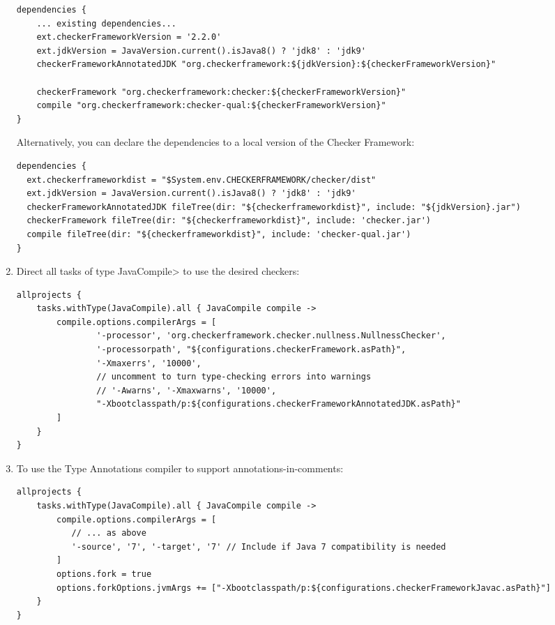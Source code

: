 \begin{enumerate}
\begin{Verbatim}
dependencies {
    ... existing dependencies...
    ext.checkerFrameworkVersion = '2.2.0'
    ext.jdkVersion = JavaVersion.current().isJava8() ? 'jdk8' : 'jdk9'
    checkerFrameworkAnnotatedJDK "org.checkerframework:${jdkVersion}:${checkerFrameworkVersion}"

    checkerFramework "org.checkerframework:checker:${checkerFrameworkVersion}"
    compile "org.checkerframework:checker-qual:${checkerFrameworkVersion}"
}
\end{Verbatim}

Alternatively, you can declare the dependencies to a local version of the Checker Framework:

\begin{Verbatim}
dependencies {
  ext.checkerframeworkdist = "$System.env.CHECKERFRAMEWORK/checker/dist"
  ext.jdkVersion = JavaVersion.current().isJava8() ? 'jdk8' : 'jdk9'
  checkerFrameworkAnnotatedJDK fileTree(dir: "${checkerframeworkdist}", include: "${jdkVersion}.jar")
  checkerFramework fileTree(dir: "${checkerframeworkdist}", include: 'checker.jar')
  compile fileTree(dir: "${checkerframeworkdist}", include: 'checker-qual.jar')
}
\end{Verbatim}

\item Direct all tasks of type \<JavaCompile> to use the desired checkers:

\begin{mysmall}
\begin{Verbatim}
allprojects {
    tasks.withType(JavaCompile).all { JavaCompile compile ->
        compile.options.compilerArgs = [
                '-processor', 'org.checkerframework.checker.nullness.NullnessChecker',
                '-processorpath', "${configurations.checkerFramework.asPath}",
                '-Xmaxerrs', '10000',
                // uncomment to turn type-checking errors into warnings
                // '-Awarns', '-Xmaxwarns', '10000',
                "-Xbootclasspath/p:${configurations.checkerFrameworkAnnotatedJDK.asPath}"
        ]
    }
}
\end{Verbatim}
\end{mysmall}

\item To use the Type Annotations compiler to support annotations-in-comments:

\begin{mysmall}
\begin{Verbatim}
allprojects {
    tasks.withType(JavaCompile).all { JavaCompile compile ->
        compile.options.compilerArgs = [
           // ... as above
           '-source', '7', '-target', '7' // Include if Java 7 compatibility is needed
        ]
        options.fork = true
        options.forkOptions.jvmArgs += ["-Xbootclasspath/p:${configurations.checkerFrameworkJavac.asPath}"]
    }
}
\end{Verbatim}
\end{mysmall}


\end{enumerate}

